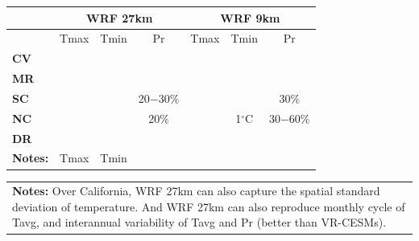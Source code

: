 \documentclass[draft,ms]{agutex}   %
\begin{document}
\begin{table}
\begin{center}
\begin{tabular*}{5.5in}{l @{\extracolsep{\fill}}cccccc}
\hline \textbf{} & \multicolumn{3}{c}{\textbf{WRF 27km}} & \multicolumn{3}{c}{\textbf{WRF 9km}} \\
\hline & Tmax & Tmin & Pr & Tmax & Tmin & Pr  \\
\hline \textbf{CV} & \cellcolor{red!60}{2$-$3$^\circ$C} & \cellcolor{blue!30}{1$^\circ$C} & \cellcolor{black!20} & \cellcolor{red!30}{1$-$2$^\circ$C}  & \cellcolor{black!20} & \cellcolor{red!60}{50$-$70$\%$} \\

\hline \textbf{MR} &  \cellcolor{blue!60}{2$^\circ$C} & \cellcolor{red!60}{2$^\circ$C} & \cellcolor{black!20} & \cellcolor{blue!60}{3$-$4$^\circ$C}  & \cellcolor{red!60}{2$^\circ$C} &  \cellcolor{red!60}{70$-$100$\%$}  \\

\hline \textbf{SC} &   \cellcolor{blue!60}{2$^\circ$C} & \cellcolor{red!30}{1$^\circ$C}  & \cellcolor{blue!30}20$-$30$\%$  &  \cellcolor{blue!60}{2$^\circ$C} & \cellcolor{red!30}{1$^\circ$C}  & \cellcolor{red!30}30$\%$ \\

\hline \textbf{NC} & \cellcolor{blue!60}{2$-$4$^\circ$C} & \cellcolor{black!20} & \cellcolor{blue!30}20$\%$ & \cellcolor{blue!60}{2$-$4$^\circ$C} & \cellcolor{red!30}1$^\circ$C & \cellcolor{red!60}30$-$60$\%$ \\

\hline \textbf{DR} & \cellcolor{black!20} & \cellcolor{black!20}  &  \cellcolor{blue!30}{20$-$40$\%$} & \cellcolor{blue!60}{2$-$3$^\circ$C} & \cellcolor{red!60}{2$^\circ$C}  &  \cellcolor{black!20} \\

\hline \hline \small\textbf{Notes:} & Tmax & Tmin & & & &\\
\hline
\end{tabular*}

\begin{tabular}{p{6in}}
\small\textbf{Notes:} Over California, WRF 27km can also capture the spatial standard deviation of temperature. And WRF 27km can also reproduce monthly cycle of Tavg, and interannual variability of Tavg and Pr (better than VR-CESMs).
\end{tabular}

\end{center}
\end{table}

\clearpage


\end{document}
